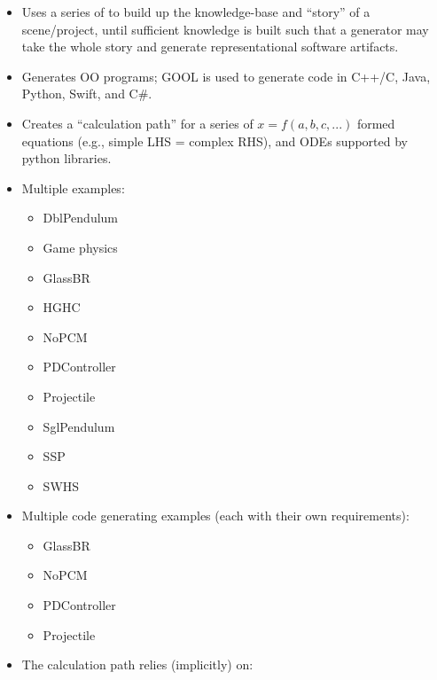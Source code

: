\begin{itemize}

    \item Uses a series of  to build up the knowledge-base and
          ``story'' of a scene/project, until sufficient knowledge is built such
          that a generator may take the whole story and generate
          representational software artifacts.

    \item Generates OO programs; GOOL is used to generate code in C++/C, Java,
          Python, Swift, and C\#.

    \item Creates a ``calculation path'' for a series of $x = f(a,b,c,...)$
          formed equations (e.g., simple LHS = complex RHS), and ODEs supported
          by python libraries.

    \item Multiple examples:
          \begin{itemize}
              \item DblPendulum
              \item Game physics
              \item GlassBR
              \item HGHC
              \item NoPCM
              \item PDController
              \item Projectile
              \item SglPendulum
              \item SSP
              \item SWHS
          \end{itemize}

    \item Multiple code generating examples (each with their own requirements):
          \begin{itemize}
              \item GlassBR
              \item NoPCM
              \item PDController
              \item Projectile
          \end{itemize}

    \item The calculation path relies (implicitly) on:
          \begin{itemize}


\end{itemize}
\end{itemize}
